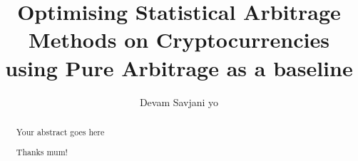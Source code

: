 \documentclass[a4paper, twoside]{report}
\title{Optimising Statistical Arbitrage Methods on Cryptocurrencies using Pure Arbitrage as a baseline}
\author{Devam Savjani yo}
\begin{document}


\begin{abstract}
    Your abstract goes here
\end{abstract}

\renewcommand{\abstractname}{Acknowledgements}
\begin{abstract}
    Thanks mum!
\end{abstract}

\tableofcontents
\listoffigures
\listoftables






% 




\end{document}
